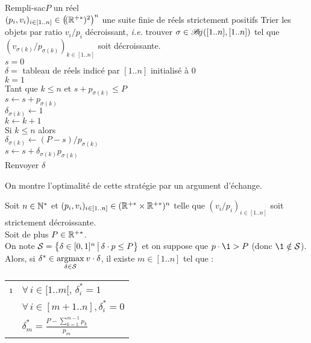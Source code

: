 			\begin{algo}{Rempli-sac}{\(P\) un réel \\ \entspace \( (p_i, v_i)_{i \in [1..n]} \in \left( \! (\mathbb{R}^{+*})^2 \right) ^n \) une suite finie de réels strictement positifs}{}{}
				Trier les objets par ratio $v_i / p_i$ décroissant, \emph{i.e.} trouver \( \sigma \in \mathscr{B} \hspace{-0.5mm} i \! j ([1..n], [1..n]) \) tel que \\
					\( \displaystyle ( v_{\sigma(k)} / p_{\sigma(k)})_{k \in [1..n]} \) soit décroissante. \\
				$s = 0$	\\
				$\delta = $ tableau de réels indicé par $[1..n]$ initialisé à 0	\\
				$k = 1$ \\
				Tant que $k \leq n$ et $s + p_{\sigma(k)} \leq P$  \\ \Indp
					\( s \leftarrow s + p_{\sigma(k)} \) \\
					\( \delta_{\sigma(k)} \leftarrow 1 \) \\
					\( k \leftarrow k + 1 \) \\ \Indm
				Si $k \leq n$ alors \\ \Indp
					\( \delta_{\sigma(k)} \leftarrow (P - s)/p_{\sigma(k)} \) \\
					\( s \leftarrow s + \delta_{\sigma(k)} p_{\sigma(k)} \) \\ \Indm
				Renvoyer \(\delta\)
			\end{algo}
			
			On montre l'optimalité de cette stratégie par un argument d'échange.

			\begin{Propriete}
				Soit $n \in \mathbb{N}^*$ et \( (p_i, v_i)_{i \in [1..n]} \in (\mathbb{R}^{+*} \times \mathbb{R}^{+*})^n \) telle que \( \left( v_i/p_i \right)_{i \in [1..n]} \) soit strictement décroissante. \\
				Soit de plus $P \in \mathbb{R}^{+*}$. \\
				On note \(\mathcal{S} = \left\{ \delta \in [0, 1]^n \, \middle| \, \delta \cdot p \leq P \right\} \) et on suppose que \( p \dotp \1 > P \) (donc \( \1 \notin \cal{S} \)).
				\nt
				\colsep{1.5pt}
				Alors, si \( \delta^* \in \underset{\delta \in \mathcal{S}}{\mathrm{argmax}} \: v \cdot \delta \), il existe \( m \in [1..n] \) tel que :
						\!\begin{tabular}[t]{cl}
							\i & \( \forall \, i \in [1..m[, \, \delta^*_i = 1 \) \\
							\ii & \( \forall \, i \in [m+1..n], \delta^*_i = 0 \) \\
							\iii & \( \delta^*_m = \displaystyle \frac{\displaystyle P - \sum\nolimits_{k=1}^{m-1} p_k}{p_m} \)
						\end{tabular}
			\end{Propriete}
			
